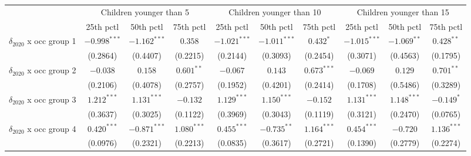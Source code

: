 \begin{tabular}{l|ccc|ccc|ccc}
\toprule
{} & \multicolumn{3}{c}{Children younger than 5} & \multicolumn{3}{c}{Children younger than 10} & \multicolumn{3}{c}{Children younger than 15} \\
{} &               25th pctl &       50th pctl &       75th pctl &                25th pctl &       50th pctl &       75th pctl &                25th pctl &       50th pctl &       75th pctl \\
\midrule
$\delta_{2020}$ x occ group 1          &          $-0.998^{***}$ &  $-1.162^{***}$ &         $0.358$ &           $-1.021^{***}$ &  $-1.011^{***}$ &       $0.432^*$ &           $-1.015^{***}$ &   $-1.069^{**}$ &    $0.428^{**}$ \\
                                       &                (0.2864) &        (0.4407) &        (0.2215) &                 (0.2144) &        (0.3093) &        (0.2454) &                 (0.3071) &        (0.4563) &        (0.1795) \\
$\delta_{2020}$ x occ group 2          &                $-0.038$ &         $0.158$ &    $0.601^{**}$ &                 $-0.067$ &         $0.143$ &   $0.673^{***}$ &                 $-0.069$ &         $0.129$ &    $0.701^{**}$ \\
                                       &                (0.2106) &        (0.4078) &        (0.2757) &                 (0.1952) &        (0.4201) &        (0.2414) &                 (0.1708) &        (0.5486) &        (0.3289) \\
$\delta_{2020}$ x occ group 3          &           $1.212^{***}$ &   $1.131^{***}$ &        $-0.132$ &            $1.129^{***}$ &   $1.150^{***}$ &        $-0.152$ &            $1.131^{***}$ &   $1.148^{***}$ &      $-0.149^*$ \\
                                       &                (0.3637) &        (0.3025) &        (0.1122) &                 (0.3969) &        (0.3043) &        (0.1119) &                 (0.3121) &        (0.2470) &        (0.0765) \\
$\delta_{2020}$ x occ group 4          &           $0.420^{***}$ &  $-0.871^{***}$ &   $1.080^{***}$ &            $0.455^{***}$ &   $-0.735^{**}$ &   $1.164^{***}$ &            $0.454^{***}$ &        $-0.720$ &   $1.136^{***}$ \\
                                       &                (0.0976) &        (0.2321) &        (0.2213) &                 (0.0835) &        (0.3617) &        (0.2721) &                 (0.1390) &        (0.2779) &        (0.2274) \\

\end{tabular}
